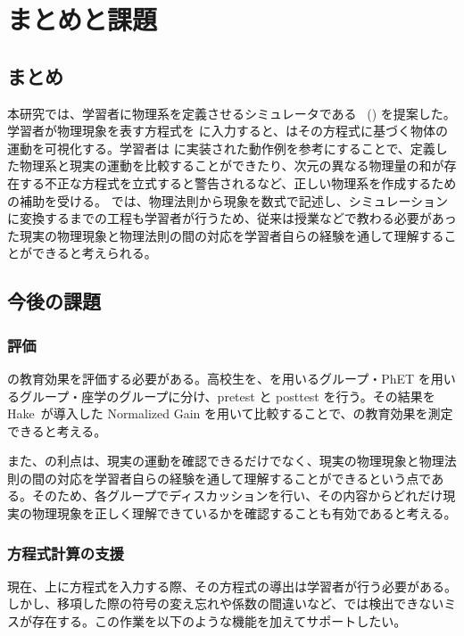 \chapter{まとめと課題} \label{conclusion}

\section{まとめ}

本研究では、学習者に物理系を定義させるシミュレータである \simname~(\simnamealt) を提案した。
学習者が物理現象を表す方程式を \simname に入力すると、\simname はその方程式に基づく物体の運動を可視化する。学習者は \simname に実装された動作例を参考にすることで、定義した物理系と現実の運動を比較することができたり、次元の異なる物理量の和が存在する不正な方程式を立式すると警告されるなど、正しい物理系を作成するための補助を受ける。
\simname では、物理法則から現象を数式で記述し、シミュレーションに変換するまでの工程も学習者が行うため、従来は授業などで教わる必要があった現実の物理現象と物理法則の間の対応を学習者自らの経験を通して理解することができると考えられる。

\section{今後の課題}

\subsection{評価}

\simname の教育効果を評価する必要がある。高校生を、\simname を用いるグループ・PhET を用いるグループ・座学のグループに分け、pretest と posttest を行う。その結果を Hake~\cite{hake_1998}が導入した Normalized Gain を用いて比較することで、\simname の教育効果を測定できると考える。

また、\simname の利点は、現実の運動を確認できるだけでなく、現実の物理現象と物理法則の間の対応を学習者自らの経験を通して理解することができるという点である。そのため、各グループでディスカッションを行い、その内容からどれだけ現実の物理現象を正しく理解できているかを確認することも有効であると考える。

\subsection{方程式計算の支援} \label{6.2.2}

現在、\simname 上に方程式を入力する際、その方程式の導出は学習者が行う必要がある。しかし、移項した際の符号の変え忘れや係数の間違いなど、\simname では検出できないミスが存在する。この作業を以下のような機能を加えてサポートしたい。

